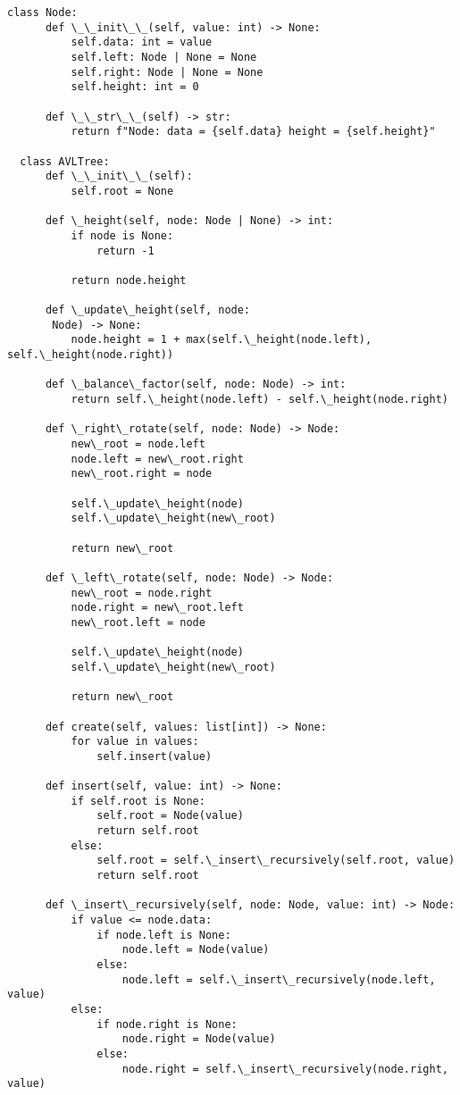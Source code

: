   \begin{lstlisting}[caption=二分ヒープの実装, label=binaryheap, frame=TRBL, label={binaryheap}]
  class Node:
      def \_\_init\_\_(self, value: int) -> None:
          self.data: int = value
          self.left: Node | None = None
          self.right: Node | None = None
          self.height: int = 0
      
      def \_\_str\_\_(self) -> str:
          return f"Node: data = {self.data} height = {self.height}"
          
  class AVLTree:
      def \_\_init\_\_(self):
          self.root = None
      
      def \_height(self, node: Node | None) -> int:
          if node is None:
              return -1
          
          return node.height
          
      def \_update\_height(self, node:
       Node) -> None:
          node.height = 1 + max(self.\_height(node.left), self.\_height(node.right))
  
      def \_balance\_factor(self, node: Node) -> int:
          return self.\_height(node.left) - self.\_height(node.right)
  
      def \_right\_rotate(self, node: Node) -> Node:
          new\_root = node.left
          node.left = new\_root.right
          new\_root.right = node
          
          self.\_update\_height(node)
          self.\_update\_height(new\_root)
          
          return new\_root 
      
      def \_left\_rotate(self, node: Node) -> Node:
          new\_root = node.right
          node.right = new\_root.left
          new\_root.left = node
          
          self.\_update\_height(node)
          self.\_update\_height(new\_root)
          
          return new\_root
          
      def create(self, values: list[int]) -> None:
          for value in values:
              self.insert(value)
      
      def insert(self, value: int) -> None:
          if self.root is None:
              self.root = Node(value)
              return self.root
          else:
              self.root = self.\_insert\_recursively(self.root, value)
              return self.root
      
      def \_insert\_recursively(self, node: Node, value: int) -> Node:
          if value <= node.data:
              if node.left is None:
                  node.left = Node(value)
              else:
                  node.left = self.\_insert\_recursively(node.left, value)
          else:
              if node.right is None:
                  node.right = Node(value)
              else:
                  node.right = self.\_insert\_recursively(node.right, value)
          

\end{lstlisting}
